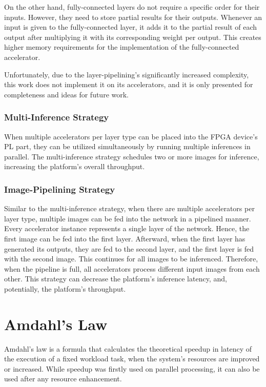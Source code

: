 On the other hand, fully-connected layers do not require a specific order for their inputs. However, they need to store partial results for their outputs. Whenever an input is given to the fully-connected layer, it adds it to the partial result of each output after multiplying it with its corresponding weight per output. This creates higher memory requirements for the implementation of the fully-connected accelerator.

Unfortunately, due to the layer-pipelining's significantly increased complexity, this work does not implement it on its accelerators, and it is only presented for completeness and ideas for future work.

\subsubsection{Multi-Inference Strategy}
When multiple accelerators per layer type can be placed into the FPGA device's PL part, they can be utilized simultaneously by running multiple inferences in parallel. The multi-inference strategy schedules two or more images for inference, increasing the platform's overall throughput.

\subsubsection{Image-Pipelining Strategy}
Similar to the multi-inference strategy, when there are multiple accelerators per layer type, multiple images can be fed into the network in a pipelined manner. Every accelerator instance represents a single layer of the network. Hence, the first image can be fed into the first layer. Afterward, when the first layer has generated its outputs, they are fed to the second layer, and the first layer is fed with the second image. This continues for all images to be inferenced. Therefore, when the pipeline is full, all accelerators process different input images from each other. This strategy can decrease the platform's inference latency, and, potentially, the platform's throughput.

\section{Amdahl's Law}
\label{sec:Amdahls-Law}
Amdahl's law \cite{Improvements-in-Multiprocessor-System-Design} is a formula that calculates the theoretical speedup in latency of the execution of a fixed workload task, when the system's resources are improved or increased. While speedup was firstly used on parallel processing, it can also be used after any resource enhancement.

